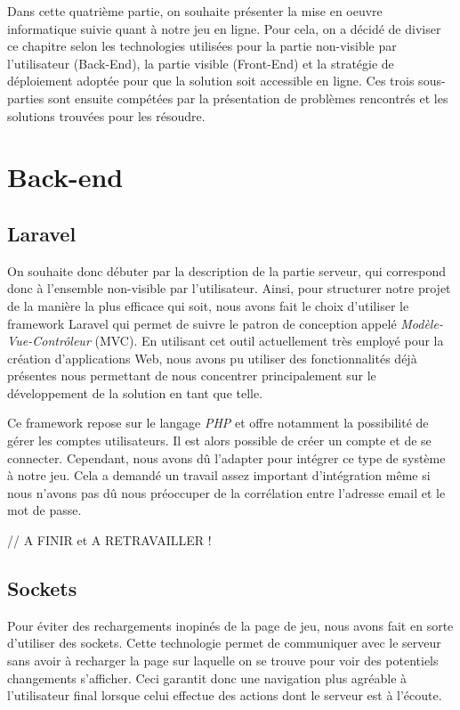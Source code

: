 \documentclass{tnreport}
\begin{document}
Dans cette quatrième partie, on souhaite présenter la mise en oeuvre informatique suivie quant à notre jeu en ligne. Pour cela, on a décidé de diviser ce chapitre selon les technologies utilisées pour la partie non-visible par l'utilisateur (Back-End), la partie visible (Front-End) et la stratégie de déploiement adoptée pour que la solution soit accessible en ligne. Ces trois sous-parties sont ensuite compétées par la présentation de problèmes rencontrés et les solutions trouvées pour les résoudre. 

\section{Back-end}

\subsection{Laravel}

On souhaite donc débuter par la description de la partie serveur, qui correspond donc à l'ensemble non-visible par l'utilisateur. Ainsi, pour structurer notre projet de la manière la plus efficace qui soit, nous avons fait le choix d'utiliser le framework Laravel qui permet de suivre le patron de conception appelé \textit{Modèle-Vue-Contrôleur} (MVC). En utilisant cet outil actuellement très employé pour la création d'applications Web, nous avons pu utiliser des fonctionnalités déjà présentes nous permettant de nous concentrer principalement sur le développement de la solution en tant que telle.

Ce framework repose sur le langage \textit{PHP} et offre notamment la possibilité de gérer les comptes utilisateurs. Il est alors possible de créer un compte et de se connecter. Cependant, nous avons dû l'adapter pour intégrer ce type de système à notre jeu. Cela a demandé un travail assez important d'intégration même si nous n'avons pas dû nous préoccuper de la corrélation entre l'adresse email et le mot de passe. 

// A FINIR et A RETRAVAILLER !

\subsection{Sockets}

Pour éviter des rechargements inopinés de la page de jeu, nous avons fait en sorte d'utiliser des sockets. Cette technologie permet de communiquer avec le serveur sans avoir à recharger la page sur laquelle on se trouve pour voir des potentiels changements s'afficher. Ceci garantit donc une navigation plus agréable à l'utilisateur final lorsque celui effectue des actions dont le serveur est à l'écoute. 
\end{document}
